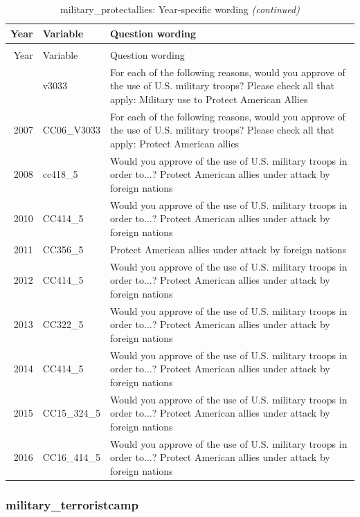 \documentclass[12pt]{article}
\begin{document}
\begin{longtable}[t]{rl>{\raggedright\arraybackslash}p{10cm}}
\caption{\label{tab:unnamed-chunk-4}military\_protectallies: Year-specific wording}\\
\toprule
Year & Variable & Question wording\\
\midrule
\endfirsthead
\caption[]{military\_protectallies: Year-specific wording \textit{(continued)}}\\
\toprule
Year & Variable & Question wording\\
\midrule
\endhead
\
\endfoot
\bottomrule
\endlastfoot
2006 & v3033 & For each of the following reasons, would you approve of the use of U.S. military troops? Please check all that apply: Military use to Protect American Allies\\
2007 & CC06\_V3033 & For each of the following reasons, would you approve of the use of U.S. military troops? Please check all that apply: Protect American allies\\
2008 & cc418\_5 & Would you approve of the use of U.S. military troops in order to...? Protect American allies under attack by foreign nations\\
2010 & CC414\_5 & Would you approve of the use of U.S. military troops in order to...? Protect American allies under attack by foreign nations\\
2011 & CC356\_5 & Protect American allies under attack by foreign nations\\
2012 & CC414\_5 & Would you approve of the use of U.S. military troops in order to...? Protect American allies under attack by foreign nations\\
2013 & CC322\_5 & Would you approve of the use of U.S. military troops in order to...? Protect American allies under attack by foreign nations\\
2014 & CC414\_5 & Would you approve of the use of U.S. military troops in order to...? Protect American allies under attack by foreign nations\\
2015 & CC15\_324\_5 & Would you approve of the use of U.S. military troops in order to...? Protect American allies under attack by foreign nations\\
2016 & CC16\_414\_5 & Would you approve of the use of U.S. military troops in order to...? Protect American allies under attack by foreign nations\\*
\end{longtable}

\subsubsection{military\_terroristcamp}\label{military_terroristcamp}
\end{document}

